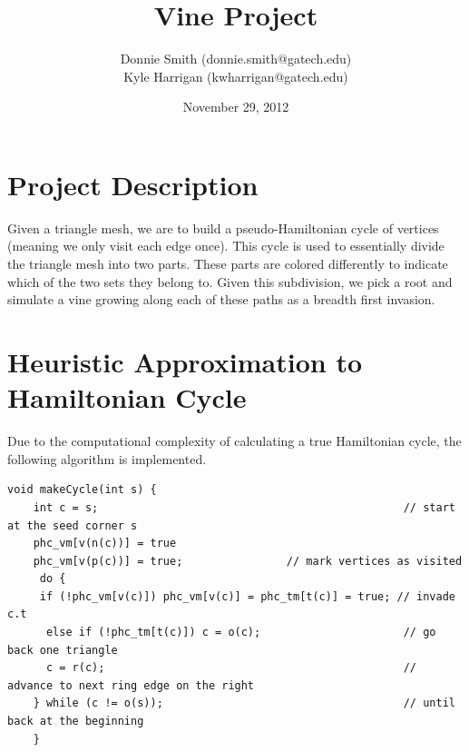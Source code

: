 \documentclass[letterpaper,10pt]{IEEEtran}
\title{Vine Project}
\author{
Donnie Smith (donnie.smith@gatech.edu) \\
Kyle Harrigan (kwharrigan@gatech.edu) 
}
\date{November 29, 2012}                                           %
\begin{document}


\maketitle

 
 
 


%

\section{Project Description}

Given a triangle mesh, we are to build a pseudo-Hamiltonian cycle of vertices (meaning we only visit each edge once).   This cycle is used to essentially divide the triangle mesh into two parts.  These parts are colored differently to indicate which of the two sets they belong to.  Given this subdivision, we pick a root and simulate a vine growing along each of these paths as a breadth first invasion. 

\section{Heuristic Approximation to Hamiltonian Cycle }

Due to the computational complexity of calculating a true Hamiltonian cycle, the following algorithm is implemented. 

{\tiny
\begin{verbatim}
void makeCycle(int s) {
    int c = s;                                               // start at the seed corner s
    phc_vm[v(n(c))] = true
    phc_vm[v(p(c))] = true;                // mark vertices as visited
     do {
     if (!phc_vm[v(c)]) phc_vm[v(c)] = phc_tm[t(c)] = true; // invade c.t
      else if (!phc_tm[t(c)]) c = o(c);                      // go back one triangle
      c = r(c);                                              // advance to next ring edge on the right
    } while (c != o(s));                                     // until back at the beginning
    }
\end{verbatim}
}
\end{document}
